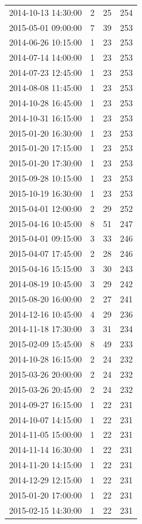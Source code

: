 \begin{tabular}{lrrr}
2014-10-13 14:30:00 & 2 & 25 & 254 \\
2015-05-01 09:00:00 & 7 & 39 & 253 \\
2014-06-26 10:15:00 & 1 & 23 & 253 \\
2014-07-14 14:00:00 & 1 & 23 & 253 \\
2014-07-23 12:45:00 & 1 & 23 & 253 \\
2014-08-08 11:45:00 & 1 & 23 & 253 \\
2014-10-28 16:45:00 & 1 & 23 & 253 \\
2014-10-31 16:15:00 & 1 & 23 & 253 \\
2015-01-20 16:30:00 & 1 & 23 & 253 \\
2015-01-20 17:15:00 & 1 & 23 & 253 \\
2015-01-20 17:30:00 & 1 & 23 & 253 \\
2015-09-28 10:15:00 & 1 & 23 & 253 \\
2015-10-19 16:30:00 & 1 & 23 & 253 \\
2015-04-01 12:00:00 & 2 & 29 & 252 \\
2015-04-16 10:45:00 & 8 & 51 & 247 \\
2015-04-01 09:15:00 & 3 & 33 & 246 \\
2015-04-07 17:45:00 & 2 & 28 & 246 \\
2015-04-16 15:15:00 & 3 & 30 & 243 \\
2014-08-19 10:45:00 & 3 & 29 & 242 \\
2015-08-20 16:00:00 & 2 & 27 & 241 \\
2014-12-16 10:45:00 & 4 & 29 & 236 \\
2014-11-18 17:30:00 & 3 & 31 & 234 \\
2015-02-09 15:45:00 & 8 & 49 & 233 \\
2014-10-28 16:15:00 & 2 & 24 & 232 \\
2015-03-26 20:00:00 & 2 & 24 & 232 \\
2015-03-26 20:45:00 & 2 & 24 & 232 \\
2014-09-27 16:15:00 & 1 & 22 & 231 \\
2014-10-07 14:15:00 & 1 & 22 & 231 \\
2014-11-05 15:00:00 & 1 & 22 & 231 \\
2014-11-14 16:30:00 & 1 & 22 & 231 \\
2014-11-20 14:15:00 & 1 & 22 & 231 \\
2014-12-29 12:15:00 & 1 & 22 & 231 \\
2015-01-20 17:00:00 & 1 & 22 & 231 \\
2015-02-15 14:30:00 & 1 & 22 & 231 \\

\end{tabular}
